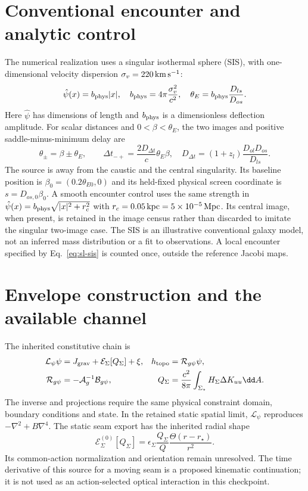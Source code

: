 \section{Conventional encounter and analytic control}
\label{sec:sl-galaxy}
The numerical realization uses a singular isothermal sphere (SIS), with
one-dimensional velocity dispersion $\sigma_v=220\,{\rm km\,s^{-1}}$:
\begin{equation}
 \hat\psi(x)=b_{\rm phys}|x|,
 \quad b_{\rm phys}=4\pi\frac{\sigma_v^2}{c^2},
 \quad \theta_E=b_{\rm phys}\frac{D_{ls}}{D_{os}}.
 \label{eq:sl-sis}
\end{equation}
Here $\hat\psi$ has dimensions of length and $b_{\rm phys}$ is a
dimensionless deflection amplitude. For scalar distances and
$0<\beta<\theta_E$, the two images and positive saddle-minus-minimum delay
are
\begin{equation}
 \theta_\pm=\beta\pm\theta_E,
 \qquad \Delta t_{-+}=\frac{2D_{\Delta t}}{c}\theta_E\beta,
 \quad D_{\Delta t}=(1+z_l)\frac{D_{ol}D_{os}}{D_{ls}}.
 \label{eq:sl-sis-control}
\end{equation}
The source is away from the caustic and the central singularity.
Its baseline position is $\beta_0=(0.2\theta_{E0},0)$ and its held-fixed
physical screen coordinate is $s=D_{os,0}\beta_0$. A smooth encounter
control uses the same strength in
$\hat\psi(x)=b_{\rm phys}\sqrt{|x|^2+r_c^2}$ with
$r_c=0.05\,{\rm kpc}=5\times10^{-5}\,{\rm Mpc}$. Its central image,
when present, is retained in the image census rather than discarded to
imitate the singular two-image case.
The SIS is an illustrative conventional galaxy model, not an inferred mass
distribution or a fit to observations. A local encounter specified by
Eq.~\eqref{eq:sl-sis} is counted once, outside the reference Jacobi maps.

\section{Envelope construction and the available channel}
\label{sec:sl-envelope}
The inherited constitutive chain is
\begin{align}
 \mathcal L_\psi\psi&=J_{\rm grav}+\mathcal E_\Sigma[Q_\Sigma]+\xi,
 & h_{\rm topo}&=\mathcal R_{g\psi}\psi,\label{eq:sl-envelope-chain}\\
 \mathcal R_{g\psi}&=-\mathcal A_g^{-1}\mathcal B_{g\psi},
 &Q_\Sigma&=\frac{c^2}{8\pi}\int_{\Sigma_\star}
 H_\Sigma\Delta K_{uu}\dd A.\nonumber
\end{align}
The inverse and projections require the same physical constraint domain,
boundary conditions and state. In the retained static spatial limit,
$\mathcal L_\psi$ reproduces $-\nabla^2+B\nabla^4$. The static seam export
has the inherited radial shape
\begin{equation}
 \mathcal E_\Sigma^{(0)}[Q_\Sigma]
 =\epsilon_\Sigma\frac{Q_\Sigma}{Q}
 \frac{\Theta(r-r_\star)}{r^2}.
 \label{eq:sl-static-seam}
\end{equation}
Its common-action normalization and orientation remain unresolved.
The time derivative of this source for a moving seam is a proposed
kinematic continuation; it is not used as an action-selected optical
interaction in this checkpoint.

